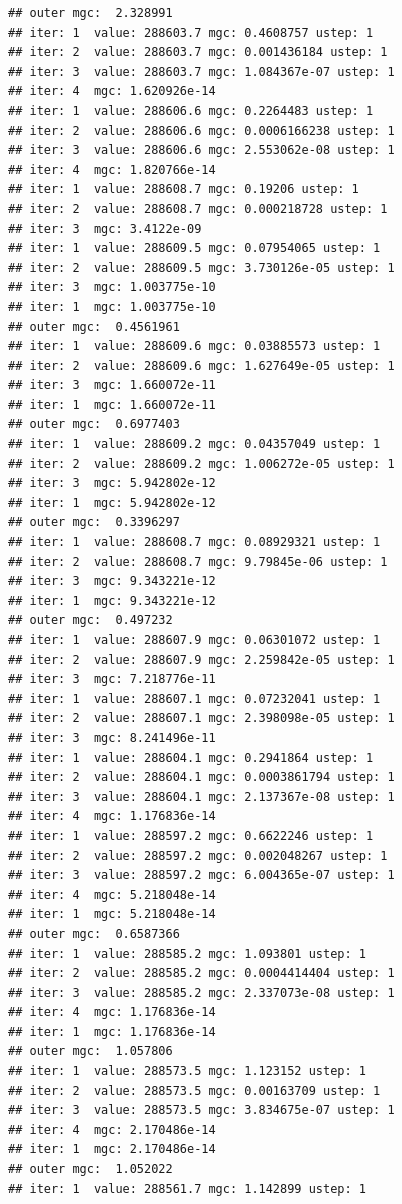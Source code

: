 \documentclass{article}\usepackage[]{graphicx}\usepackage[]{xcolor}
\makeatletter
\newenvironment{kframe}{%
 \def\at@end@of@kframe{}%
 \ifinner\ifhmode%
  \def\at@end@of@kframe{\end{minipage}}%
  \begin{minipage}{\columnwidth}%
 \fi\fi%
 \def\FrameCommand##1{\hskip\@totalleftmargin \hskip-\fboxsep
 \colorbox{shadecolor}{##1}\hskip-\fboxsep
     \hskip-\linewidth \hskip-\@totalleftmargin \hskip\columnwidth}%
 \MakeFramed {\advance\hsize-\width
   \@totalleftmargin\z@ \linewidth\hsize
   \@setminipage}}%
 {\par\unskip\endMakeFramed%
 \at@end@of@kframe}
\newenvironment{knitrout}{}{} %
\makeatother
\begin{document}
\begin{knitrout}
\begin{kframe}
\begin{verbatim}
## outer mgc:  2.328991 
## iter: 1  value: 288603.7 mgc: 0.4608757 ustep: 1 
## iter: 2  value: 288603.7 mgc: 0.001436184 ustep: 1 
## iter: 3  value: 288603.7 mgc: 1.084367e-07 ustep: 1 
## iter: 4  mgc: 1.620926e-14 
## iter: 1  value: 288606.6 mgc: 0.2264483 ustep: 1 
## iter: 2  value: 288606.6 mgc: 0.0006166238 ustep: 1 
## iter: 3  value: 288606.6 mgc: 2.553062e-08 ustep: 1 
## iter: 4  mgc: 1.820766e-14 
## iter: 1  value: 288608.7 mgc: 0.19206 ustep: 1 
## iter: 2  value: 288608.7 mgc: 0.000218728 ustep: 1 
## iter: 3  mgc: 3.4122e-09 
## iter: 1  value: 288609.5 mgc: 0.07954065 ustep: 1 
## iter: 2  value: 288609.5 mgc: 3.730126e-05 ustep: 1 
## iter: 3  mgc: 1.003775e-10 
## iter: 1  mgc: 1.003775e-10 
## outer mgc:  0.4561961 
## iter: 1  value: 288609.6 mgc: 0.03885573 ustep: 1 
## iter: 2  value: 288609.6 mgc: 1.627649e-05 ustep: 1 
## iter: 3  mgc: 1.660072e-11 
## iter: 1  mgc: 1.660072e-11 
## outer mgc:  0.6977403 
## iter: 1  value: 288609.2 mgc: 0.04357049 ustep: 1 
## iter: 2  value: 288609.2 mgc: 1.006272e-05 ustep: 1 
## iter: 3  mgc: 5.942802e-12 
## iter: 1  mgc: 5.942802e-12 
## outer mgc:  0.3396297 
## iter: 1  value: 288608.7 mgc: 0.08929321 ustep: 1 
## iter: 2  value: 288608.7 mgc: 9.79845e-06 ustep: 1 
## iter: 3  mgc: 9.343221e-12 
## iter: 1  mgc: 9.343221e-12 
## outer mgc:  0.497232 
## iter: 1  value: 288607.9 mgc: 0.06301072 ustep: 1 
## iter: 2  value: 288607.9 mgc: 2.259842e-05 ustep: 1 
## iter: 3  mgc: 7.218776e-11 
## iter: 1  value: 288607.1 mgc: 0.07232041 ustep: 1 
## iter: 2  value: 288607.1 mgc: 2.398098e-05 ustep: 1 
## iter: 3  mgc: 8.241496e-11 
## iter: 1  value: 288604.1 mgc: 0.2941864 ustep: 1 
## iter: 2  value: 288604.1 mgc: 0.0003861794 ustep: 1 
## iter: 3  value: 288604.1 mgc: 2.137367e-08 ustep: 1 
## iter: 4  mgc: 1.176836e-14 
## iter: 1  value: 288597.2 mgc: 0.6622246 ustep: 1 
## iter: 2  value: 288597.2 mgc: 0.002048267 ustep: 1 
## iter: 3  value: 288597.2 mgc: 6.004365e-07 ustep: 1 
## iter: 4  mgc: 5.218048e-14 
## iter: 1  mgc: 5.218048e-14 
## outer mgc:  0.6587366 
## iter: 1  value: 288585.2 mgc: 1.093801 ustep: 1 
## iter: 2  value: 288585.2 mgc: 0.0004414404 ustep: 1 
## iter: 3  value: 288585.2 mgc: 2.337073e-08 ustep: 1 
## iter: 4  mgc: 1.176836e-14 
## iter: 1  mgc: 1.176836e-14 
## outer mgc:  1.057806 
## iter: 1  value: 288573.5 mgc: 1.123152 ustep: 1 
## iter: 2  value: 288573.5 mgc: 0.00163709 ustep: 1 
## iter: 3  value: 288573.5 mgc: 3.834675e-07 ustep: 1 
## iter: 4  mgc: 2.170486e-14 
## iter: 1  mgc: 2.170486e-14 
## outer mgc:  1.052022 
## iter: 1  value: 288561.7 mgc: 1.142899 ustep: 1 

\end{verbatim}
\end{kframe}
\end{knitrout}
\end{document}
